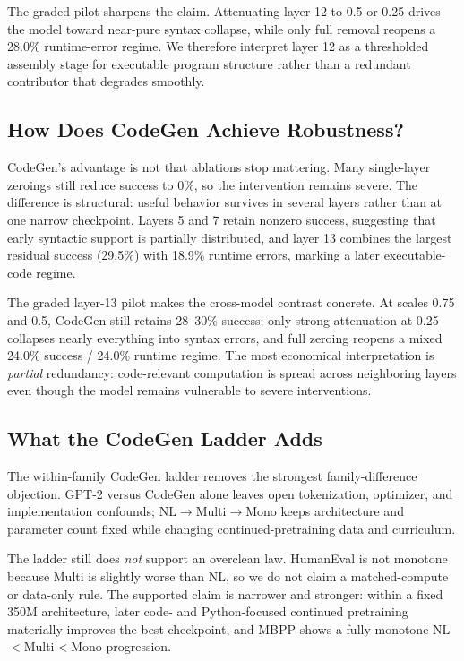 \documentclass[preprint,12pt,authoryear]{elsarticle}
\begin{document}
The graded pilot sharpens the claim. Attenuating layer 12 to 0.5 or 0.25 drives the model toward near-pure syntax collapse, while only full removal reopens a 28.0\% runtime-error regime. We therefore interpret layer 12 as a thresholded assembly stage for executable program structure rather than a redundant contributor that degrades smoothly.

\subsection{How Does CodeGen Achieve Robustness?}

CodeGen's advantage is not that ablations stop mattering. Many single-layer zeroings still reduce success to 0\%, so the intervention remains severe. The difference is structural: useful behavior survives in several layers rather than at one narrow checkpoint. Layers 5 and 7 retain nonzero success, suggesting that early syntactic support is partially distributed, and layer 13 combines the largest residual success (29.5\%) with 18.9\% runtime errors, marking a later executable-code regime.

The graded layer-13 pilot makes the cross-model contrast concrete. At scales 0.75 and 0.5, CodeGen still retains 28--30\% success; only strong attenuation at 0.25 collapses nearly everything into syntax errors, and full zeroing reopens a mixed 24.0\% success / 24.0\% runtime regime. The most economical interpretation is \emph{partial} redundancy: code-relevant computation is spread across neighboring layers even though the model remains vulnerable to severe interventions.

\subsection{What the CodeGen Ladder Adds}

The within-family CodeGen ladder removes the strongest family-difference objection. GPT-2 versus CodeGen alone leaves open tokenization, optimizer, and implementation confounds; NL$\rightarrow$Multi$\rightarrow$Mono keeps architecture and parameter count fixed while changing continued-pretraining data and curriculum.

The ladder still does \emph{not} support an overclean law. HumanEval is not monotone because Multi is slightly worse than NL, so we do not claim a matched-compute or data-only rule. The supported claim is narrower and stronger: within a fixed 350M architecture, later code- and Python-focused continued pretraining materially improves the best checkpoint, and MBPP shows a fully monotone NL$<$Multi$<$Mono progression.
\end{document}
